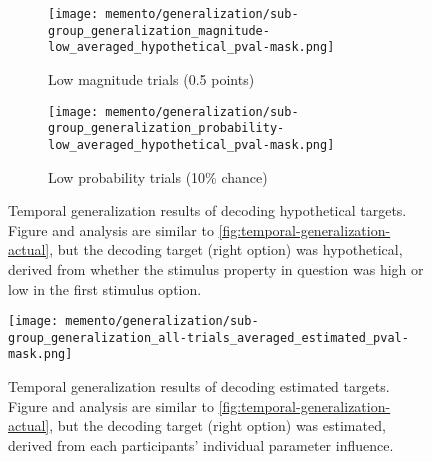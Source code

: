 \begin{figure}
	\begin{subfigure}[c]{0.5\textwidth}
		\texttt{[image: memento/generalization/sub-group\_generalization\_magnitude-low\_averaged\_hypothetical\_pval-mask.png]}
		\caption{Low magnitude trials (0.5 points)}
		\label{fig:generalization-mag-low-hypothetical}
	\end{subfigure}
	\begin{subfigure}[c]{0.5\textwidth}
		\texttt{[image: memento/generalization/sub-group\_generalization\_probability-low\_averaged\_hypothetical\_pval-mask.png]}
		\caption{Low probability trials (10\% chance)}
		\label{fig:generalization-prob-low-hypothetical}
	\end{subfigure}
	\caption[Temporal generalization: Hypothetical choice]{Temporal generalization results of decoding hypothetical targets. Figure and analysis are similar to \ref{fig:temporal-generalization-actual}, but the decoding target (right option) was hypothetical, derived from whether the stimulus property in question was high or low in the first stimulus option.}
	\label{fig:temporal-generalization-hypothetical}
\end{figure}

\begin{figure}
	\centering
	\texttt{[image: memento/generalization/sub-group\_generalization\_all-trials\_averaged\_estimated\_pval-mask.png]}
	\caption[Temporal generalization: Estimated choice]{Temporal generalization results of decoding estimated targets. Figure and analysis are similar to \ref{fig:temporal-generalization-actual}, but the decoding target (right option) was estimated, derived from each participants' individual parameter influence.}
	\label{fig:temporal-generalization-estimated}
\end{figure}


